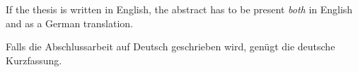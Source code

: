 
If the thesis is written in English, the abstract has to be present \emph{both} in English and as a German translation.


Falls die Abschlussarbeit auf Deutsch geschrieben wird, genügt die deutsche Kurzfassung.
